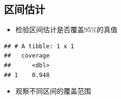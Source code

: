 \documentclass[
]{book}
\newenvironment{Shaded}{\begin{snugshade}}{\end{snugshade}}
\newcommand{\DataTypeTok}[1]{\textcolor[rgb]{0.13,0.29,0.53}{#1}}
\newcommand{\KeywordTok}[1]{\textcolor[rgb]{0.13,0.29,0.53}{\textbf{#1}}}
\newcommand{\NormalTok}[1]{#1}
\newcommand{\OperatorTok}[1]{\textcolor[rgb]{0.81,0.36,0.00}{\textbf{#1}}}
\newcommand{\StringTok}[1]{\textcolor[rgb]{0.31,0.60,0.02}{#1}}
\providecommand{\tightlist}{%
  \setlength{\itemsep}{0pt}\setlength{\parskip}{0pt}}
\begin{document}
\hypertarget{ux533aux95f4ux4f30ux8ba1}{%
\subsection{区间估计}\label{ux533aux95f4ux4f30ux8ba1}}

\begin{itemize}
\tightlist
\item
  检验区间估计是否覆盖95\%的真值
\end{itemize}

\begin{Shaded}
\end{Shaded}

\begin{verbatim}
## # A tibble: 1 x 1
##   coverage
##      <dbl>
## 1    0.948
\end{verbatim}

\begin{itemize}
\tightlist
\item
  观察不同区间的覆盖范围
\end{itemize}
\end{document}
